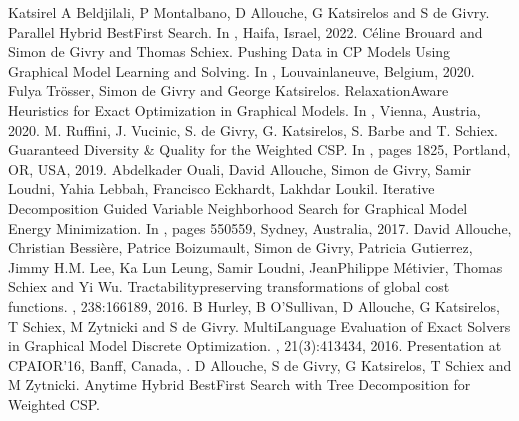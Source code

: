 \documentclass[letterpaper,10pt,openany,oneside,english]{sphinxmanual}
\begin{document}
\begin{sphinxthebibliography}{Katsirel}
\sphinxAtStartPar
A Beldjilali, P Montalbano, D Allouche, G Katsirelos and S de Givry.
Parallel Hybrid Best\sphinxhyphen{}First Search.
In , Haifa, Israel, 2022.
\sphinxAtStartPar
Céline Brouard and Simon de Givry and Thomas Schiex.
Pushing Data in CP Models Using Graphical Model Learning and Solving.
In , Louvain\sphinxhyphen{}la\sphinxhyphen{}neuve, Belgium, 2020.
\sphinxAtStartPar
Fulya Trösser, Simon de Givry and George Katsirelos.
Relaxation\sphinxhyphen{}Aware Heuristics for Exact Optimization in Graphical Models.
In , Vienna, Austria, 2020.
\sphinxAtStartPar
M. Ruffini, J. Vucinic, S. de Givry, G. Katsirelos, S. Barbe and T. Schiex.
Guaranteed Diversity \& Quality for the Weighted CSP.
In , pages 18\sphinxhyphen{}25, Portland, OR, USA, 2019.
\sphinxAtStartPar
Abdelkader Ouali, David Allouche, Simon de Givry, Samir Loudni, Yahia Lebbah, Francisco Eckhardt, Lakhdar Loukil.
Iterative Decomposition Guided Variable Neighborhood Search for Graphical Model Energy Minimization.
In , pages 550\sphinxhyphen{}559, Sydney, Australia, 2017.
\sphinxAtStartPar
David Allouche, Christian Bessière, Patrice Boizumault, Simon de Givry, Patricia Gutierrez, Jimmy H.M. Lee, Ka Lun Leung, Samir Loudni, Jean\sphinxhyphen{}Philippe Métivier, Thomas Schiex and Yi Wu.
Tractability\sphinxhyphen{}preserving transformations of global cost functions.
, 238:166\sphinxhyphen{}189, 2016.
\sphinxAtStartPar
B Hurley, B O’Sullivan, D Allouche, G Katsirelos, T Schiex, M Zytnicki and S de Givry.
Multi\sphinxhyphen{}Language Evaluation of Exact Solvers in Graphical Model Discrete Optimization.
, 21(3):413\sphinxhyphen{}434, 2016.
Presentation at CPAIOR’16, Banff, Canada,
.
\sphinxAtStartPar
D Allouche, S de Givry, G Katsirelos, T Schiex and M Zytnicki.
Anytime Hybrid Best\sphinxhyphen{}First Search with Tree Decomposition for Weighted CSP.

\end{sphinxthebibliography}
\end{document}
